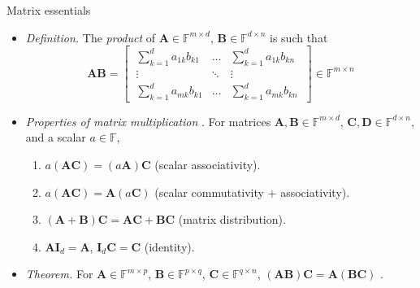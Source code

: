 \documentclass{beamer}
\numberwithin{equation}{section}
\begin{document}
\begin{frame}{Matrix essentials}
    \begin{itemize}
        \item
        \textit{Definition.} The \textit{product} of $ \mathbf{A} \in
        \mathbb{F}^{m \times d} $, $ \mathbf{B} \in \mathbb{F}^{d \times n} $
        is such that
        \begin{equation*}
            \mathbf{AB} = \begin{bmatrix}
                \ \sum_{k = 1}^da_{1k}b_{k1} & \ldots &
                    \sum_{k = 1}^da_{1k}b_{kn} \ \\
                \ \vdots & \ddots & \vdots \ \\
                \ \sum_{k = 1}^da_{mk}b_{k1} & \ldots &
                    \sum_{k = 1}^da_{mk}b_{kn} \
            \end{bmatrix} \in \mathbb{F}^{m \times n}
        \end{equation*}

        \item
	    \textit{Properties of matrix multiplication} \cite{jacob_linalg}. For
	    matrices $ \mathbf{A}, \mathbf{B} \in \mathbb{F}^{m \times d} $,
	    $ \mathbf{C}, \mathbf{D} \in \mathbb{F}^{d \times n} $, and a scalar
	    $ a \in \mathbb{F} $,
	    \begin{enumerate}
	        \item
            $ a(\mathbf{AC}) = (a\mathbf{A})\mathbf{C} $ (scalar
            associativity).

            \item
            $ a(\mathbf{AC}) = \mathbf{A}(a\mathbf{C}) $ (scalar
            commutativity + associativity).

            \item
            $ (\mathbf{A} + \mathbf{B})\mathbf{C} =
            \mathbf{AC} + \mathbf{BC} $ (matrix distribution).

            \item
            $ \mathbf{AI}_d = \mathbf{A} $, $ \mathbf{I}_d\mathbf{C} =
            \mathbf{C} $ (identity).
	    \end{enumerate}

        \item
        \textit{Theorem.} For $ \mathbf{A} \in \mathbb{F}^{m \times p} $,
        $ \mathbf{B} \in \mathbb{F}^{p \times q} $, $ \mathbf{C} \in
        \mathbb{F}^{q \times n} $, $ (\mathbf{AB})\mathbf{C} = 
        \mathbf{A}(\mathbf{BC}) $ \cite{jacob_linalg}.
    \end{itemize}
\end{frame}
\end{document}
